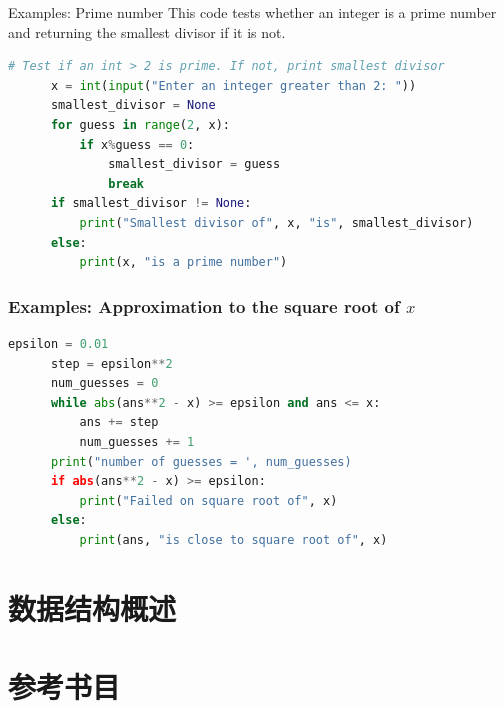 \documentclass{sintefbeamer}
\begin{document}
\begin{frame}[fragile]{Examples: Prime number}
  This code tests whether an integer is a prime number and returning the smallest divisor if it is not.
  \pause
  \begin{block}{}
    \begin{lstlisting}[language=Python]
      # Test if an int > 2 is prime. If not, print smallest divisor
      x = int(input("Enter an integer greater than 2: "))
      smallest_divisor = None
      for guess in range(2, x):
          if x%guess == 0:
              smallest_divisor = guess
              break
      if smallest_divisor != None:
          print("Smallest divisor of", x, "is", smallest_divisor)
      else:
          print(x, "is a prime number")
    \end{lstlisting}
  \end{block}
\end{frame}

\begin{frame}[fragile]
  \frametitle{Examples: Approximation to the square root of $x$}

  \begin{block}{}
    \begin{lstlisting}[language=Python]
      epsilon = 0.01
      step = epsilon**2
      num_guesses = 0
      while abs(ans**2 - x) >= epsilon and ans <= x:
          ans += step
          num_guesses += 1
      print("number of guesses = ', num_guesses)
      if abs(ans**2 - x) >= epsilon:
          print("Failed on square root of", x)
      else:
          print(ans, "is close to square root of", x)
    \end{lstlisting}
  \end{block}

\end{frame}

\section{数据结构概述}

\section{参考书目}

\backmatter
\end{document}
